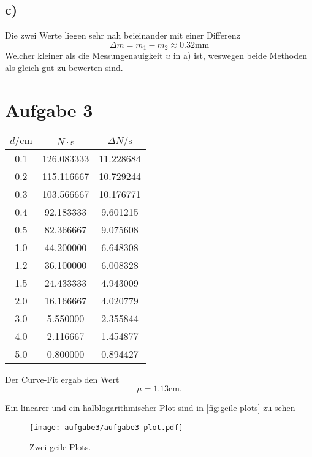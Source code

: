 \documentclass{article}
\begin{document}
\subsection*{c)}
Die zwei Werte liegen sehr nah beieinander mit einer Differenz
\[
	\Delta m = m_1 - m_2 \approx 0.32 \si\mm
\]
Welcher kleiner als die Messungenauigkeit $u$ in a) ist, weswegen
beide Methoden als gleich gut zu bewerten sind.

\section*{Aufgabe 3}
\begin{table}
	\centering
	\begin{tabular}{c c c}
		\toprule
		$d/\si{\cm}$ & $N \cdot \si{\s}$ & 
		$\Delta N/\si{\s}$ \\
		\midrule
		0.1  & 126.083333  & 11.228684 \\
		0.2  & 115.116667  & 10.729244 \\
		0.3  & 103.566667  & 10.176771 \\
		0.4  &  92.183333  &  9.601215 \\
		0.5  &  82.366667  &  9.075608 \\
		1.0  &  44.200000  &  6.648308 \\
		1.2  &  36.100000  &  6.008328 \\
		1.5  &  24.433333  &  4.943009 \\
		2.0  &  16.166667  &  4.020779 \\
		3.0  &   5.550000  &  2.355844 \\
		4.0  &   2.116667  &  1.454877 \\
		5.0  &   0.800000  &  0.894427 \\
		\bottomrule
	\end{tabular}
\end{table}
Der Curve-Fit ergab den Wert
\[
	\mu = 1.13\si{\cm}.
\]

\newpage
Ein linearer und ein halblogarithmischer Plot sind in \autoref{fig:geile-plots} zu sehen
\begin{figure}[H]
	\centering
	\texttt{[image: aufgabe3/aufgabe3-plot.pdf]}
	\caption{Zwei geile Plots.}
	\label{fig:geile-plots}
\end{figure}
\end{document}
